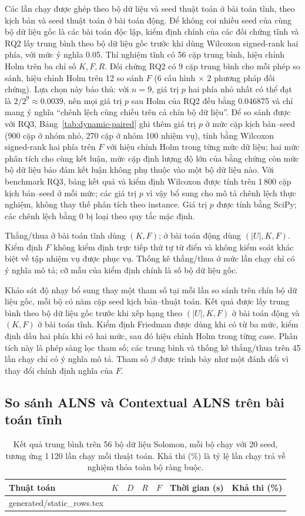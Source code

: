 \documentclass[11pt,a4paper]{article}
\makeatletter
\newcommand{\inputrows}[1]{\@@input #1 }
\makeatother
\begin{document}
Các lần chạy được ghép theo bộ dữ liệu và seed thuật toán ở bài toán tĩnh, theo kịch bản và seed thuật toán ở bài toán động. Để không coi nhiều seed của cùng bộ dữ liệu gốc là các bài toán độc lập, kiểm định chính của các đối chứng tĩnh và RQ2 lấy trung bình theo bộ dữ liệu gốc trước khi dùng Wilcoxon signed-rank hai phía, với mức ý nghĩa 0.05. Thí nghiệm tĩnh có 56 cặp trung bình, hiệu chỉnh Holm trên ba chỉ số $K,F,R$. Đối chứng RQ2 có 9 cặp trung bình cho mỗi phép so sánh, hiệu chỉnh Holm trên 12 so sánh $F$ (6 cấu hình $\times$ 2 phương pháp đối chứng). Lựa chọn này bảo thủ: với $n=9$, giá trị $p$ hai phía nhỏ nhất có thể đạt là $2/2^9\approx0.0039$, nên mọi giá trị $p$ sau Holm của RQ2 đều bằng 0.046875 và chỉ mang ý nghĩa ``chênh lệch cùng chiều trên cả chín bộ dữ liệu''. Để so sánh được với RQ3, Bảng~\ref{tab:dynamic-paired} ghi thêm giá trị $p$ ở mức cặp kịch bản--seed (900 cặp ở nhóm nhỏ, 270 cặp ở nhóm 100 nhiệm vụ), tính bằng Wilcoxon signed-rank hai phía trên $F$ với hiệu chỉnh Holm trong từng mức dữ liệu; hai mức phân tích cho cùng kết luận, mức cặp định lượng độ lớn của bằng chứng còn mức bộ dữ liệu bảo đảm kết luận không phụ thuộc vào một bộ dữ liệu nào. Với benchmark RQ3, bảng kết quả và kiểm định Wilcoxon được tính trên 1\,800 cặp kịch bản--seed ở mỗi mức; các giá trị $p$ vì vậy bổ sung cho mô tả chênh lệch thực nghiệm, không thay thế phân tích theo instance. Giá trị $p$ được tính bằng SciPy; các chênh lệch bằng 0 bị loại theo quy tắc mặc định.

Thắng/thua ở bài toán tĩnh dùng $(K,F)$; ở bài toán động dùng $(|U|,K,F)$. Kiểm định $F$ không kiểm định trực tiếp thứ tự từ điển và không kiểm soát khác biệt về tập nhiệm vụ được phục vụ. Thống kê thắng/thua ở mức lần chạy chỉ có ý nghĩa mô tả; cỡ mẫu của kiểm định chính là số bộ dữ liệu gốc.

Khảo sát độ nhạy bổ sung thay một tham số tại mỗi lần so sánh trên chín bộ dữ liệu gốc, mỗi bộ có năm cặp seed kịch bản--thuật toán. Kết quả được lấy trung bình theo bộ dữ liệu gốc trước khi xếp hạng theo $(|U|,K,F)$ ở bài toán động và $(K,F)$ ở bài toán tĩnh. Kiểm định Friedman được dùng khi có từ ba mức, kiểm định dấu hai phía khi có hai mức, sau đó hiệu chỉnh Holm trong từng case. Phân tích này là phép sàng lọc tham số; các trung bình và thống kê thắng/thua trên 45 lần chạy chỉ có ý nghĩa mô tả. Tham số $\beta$ được trình bày như một đánh đổi vì thay đổi chính định nghĩa của $F$.

\subsection{So sánh ALNS và Contextual ALNS trên bài toán tĩnh}
\begin{table}[htbp]
\centering\small
\caption{Kết quả trung bình trên 56 bộ dữ liệu Solomon, mỗi bộ chạy với 20 seed, tương ứng 1\,120 lần chạy mỗi thuật toán. Khả thi (\%) là tỷ lệ lần chạy trả về nghiệm thỏa toàn bộ ràng buộc.}
\begin{tabular}{@{}lrrrrrr@{}}
\toprule
Thuật toán & $K$ & $D$ & $R$ & $F$ & Thời gian (s) & Khả thi (\%)\\\midrule
\inputrows{generated/static_rows.tex}
\bottomrule
\end{tabular}
\label{tab:static}
\end{table}
\end{document}

